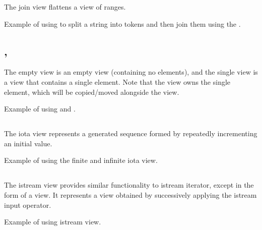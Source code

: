 The join view flattens a view of ranges.

\begin{box-note}
\footnotesize Example of using  to split a string into tokens and then join them using the .
\tcblower
{}
\end{box-note}

\subsection{\texorpdfstring{, }{\texttt{std::views::empty}, \texttt{std::views::single}}}

The empty view is an empty view (containing no elements), and the single view is a view that contains a single element.
Note that the view owns the single element, which will be copied/moved alongside the view.

\begin{box-note}
\footnotesize Example of using  and .
\tcblower
{}
\end{box-note}

\subsection{\texorpdfstring{}{\texttt{std::views::iota}}}

The iota view represents a generated sequence formed by repeatedly incrementing an initial value.

\begin{box-note}
\footnotesize Example of using the finite and infinite iota view.
\tcblower
{}
\end{box-note}

\subsection{\texorpdfstring{}{\texttt{std::views::istream}}}

The istream view provides similar functionality to istream iterator, except in the form of a view.
It represents a view obtained by successively applying the istream input operator.

\begin{box-note}
\footnotesize Example of using istream view.
\tcblower
{}
\end{box-note}